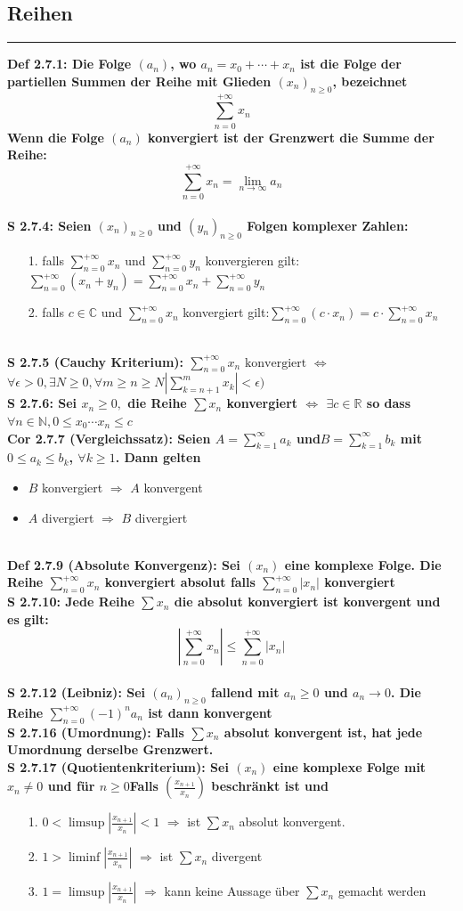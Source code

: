 \documentclass[7pt,landscape, margin = 0.1mm]{article}
\newcommand*{\mysubsection}[1]{\vspace{-2mm}\color{chaptercolor}\subsection{ #1 }
\vspace{-1mm}\hrule\vspace{1.5mm}\color{black}
\vspace{2mm}}
\newcommand{\DEF}[2]{\color{chaptercolor}\bf{Def #1}:\color{black}    \hspace{0.2cm} #2 \\}
\newcommand{\COR}[2]{\color{chaptercolor}\bf{Cor #1}:\color{black}    \hspace{0.2cm} #2 \\}
\newcommand{\SA}[2]{\color{chaptercolor}\bf{S #1}:\color{black}    \hspace{0.2cm} #2 \\}
\begin{document}
\begin{multicols}{4}
\begin{flushleft}
\mysubsection{Reihen}
\DEF{2.7.1}{Die Folge $(a_n)$, wo $a_n = x_0 + \cdots + x_n$ ist die Folge der partiellen Summen der Reihe mit Glieden $(x_n)_{n \geq 0}$, bezeichnet$$ \sum_{n=0}^{+ \infty} x_n $$ Wenn die Folge $(a_n)$ konvergiert ist der Grenzwert die Summe der Reihe:$$ \sum_{n=0}^{+ \infty} x_n = \lim_{n\to \infty} a_n $$}
\SA{2.7.4}{Seien $(x_n)_{n \geq 0}$ und $(y_n)_{n \geq 0}$ Folgen komplexer Zahlen:
\begin{itemize}
\item[1.]   falls $\sum_{n=0}^{+ \infty} x_n$ und $\sum_{n=0}^{+ \infty} y_n$ konvergieren gilt:$ \sum_{n=0}^{+ \infty} (x_n + y_n) = \sum_{n=0}^{+ \infty} x_n + \sum_{n=0}^{+ \infty} y_n $
\item[2.] falls $c \in \mathbb{C}$ und $\sum_{n=0}^{+ \infty} x_n$ konvergiert gilt:$ \sum_{n=0}^{+ \infty} (c \cdot x_n ) = c \cdot \sum_{n=0}^{+ \infty} x_n $
\end{itemize}}
\SA{2.7.5 (Cauchy Kriterium)}{$ \sum_{n=0}^{+ \infty} x_n \text{ konvergiert }\Leftrightarrow$ $ \forall \epsilon > 0, \exists N \geq 0, \forall m \geq n \geq N |\sum_{k=n+1}^{m}x_k|< \epsilon) $}
\SA{2.7.6}{Sei $x_n \geq 0,$ die Reihe $\sum x_n$ konvergiert $\Leftrightarrow$ $\exists c \in \mathbb{R}$ so dass $\forall n \in \mathbb{N}, 0 \leq  x_0 \cdots x_n \leq c$}
\COR{2.7.7 (Vergleichssatz)}{Seien $
A = \sum_{k=1}^{\infty} a_k$ und$B = \sum_{k=1}^{\infty} b_k$ mit $0\leq a_k\leq b_k$, $\forall k \geq 1$. Dann gelten \begin{itemize}
\item $B$ konvergiert $\Rightarrow$ $A$ konvergent
\item $A$ divergiert $\Rightarrow$ $B$ divergiert
\end{itemize}}
\DEF{2.7.9 (Absolute Konvergenz)}{Sei $(x_n)$ eine komplexe Folge. Die Reihe $\sum_{n=0}^{+ \infty} x_n$ konvergiert absolut falls $\sum_{n=0}^{+ \infty} |x_n|$ konvergiert}
\SA{2.7.10}{ Jede Reihe $\sum x_n$ die absolut konvergiert ist konvergent und es gilt:
$$ |\sum_{n=0}^{+ \infty}x_n| \leq \sum_{n=0}^{+ \infty}|x_n| $$}
\SA{2.7.12 (Leibniz)}{Sei $(a_n)_{n \geq 0}$ fallend mit $a_n \geq 0$ und $a_n \to 0$. Die Reihe $\sum_{n=0}^{+ \infty} (-1)^n a_n$ ist dann konvergent}
\SA{2.7.16 (Umordnung)}{Falls $\sum x_n$ absolut konvergent ist, hat jede Umordnung derselbe Grenzwert.}
\SA{2.7.17 (Quotientenkriterium)}{Sei $(x_n)$ eine komplexe Folge mit $x_n \neq 0$ und für $n \geq 0$Falls $\left(\frac{x_{n+1}}{x_n} \right)$ beschränkt ist und
\begin{itemize}
\item[1.] $0 < \limsup |\frac{x_{n+1}}{x_n}| < 1$ $\Rightarrow$ ist $\sum x_n$ absolut konvergent.
\item[2.] $1> \liminf |\frac{x_{n+1}}{x_n}|$ $\Rightarrow$ ist $\sum x_n$ divergent
\item[3.] $1 = \limsup |\frac{x_{n+1}}{x_n}|$ $\Rightarrow$ kann keine Aussage über $\sum x_n$ gemacht werden


\end{itemize}}
\end{flushleft}
\end{multicols}
\end{document}
